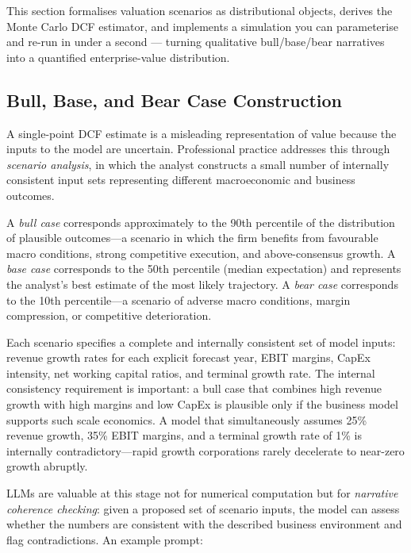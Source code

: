 \begin{deepdive}
This section formalises valuation scenarios as distributional objects, derives the
Monte Carlo DCF estimator, and implements a simulation you can parameterise and
re-run in under a second — turning qualitative bull/base/bear narratives into a
quantified enterprise-value distribution.

\subsection{Bull, Base, and Bear Case Construction}
\label{subsec:bv-scenarios-cases}

A single-point DCF estimate is a misleading representation of value because the inputs
to the model are uncertain. Professional practice addresses this through \emph{scenario
analysis}, in which the analyst constructs a small number of internally consistent
input sets representing different macroeconomic and business outcomes.

\begin{definition}
\label{def:scenarios}
A \emph{bull case} corresponds approximately to the 90th percentile of the
distribution of plausible outcomes---a scenario in which the firm benefits from
favourable macro conditions, strong competitive execution, and above-consensus
growth. A \emph{base case} corresponds to the 50th percentile (median expectation)
and represents the analyst's best estimate of the most likely trajectory. A
\emph{bear case} corresponds to the 10th percentile---a scenario of adverse macro
conditions, margin compression, or competitive deterioration.
\end{definition}

Each scenario specifies a complete and internally consistent set of model inputs:
revenue growth rates for each explicit forecast year, EBIT margins, CapEx intensity,
net working capital ratios, and terminal growth rate. The internal consistency
requirement is important: a bull case that combines high revenue growth with high
margins and low CapEx is plausible only if the business model supports such scale
economics. A model that simultaneously assumes 25\% revenue growth, 35\% EBIT margins,
and a terminal growth rate of 1\% is internally contradictory---rapid growth
corporations rarely decelerate to near-zero growth abruptly.

LLMs are valuable at this stage not for numerical computation but for
\emph{narrative coherence checking}: given a proposed set of scenario inputs, the
model can assess whether the numbers are consistent with the described business
environment and flag contradictions. An example prompt:


\end{deepdive}
